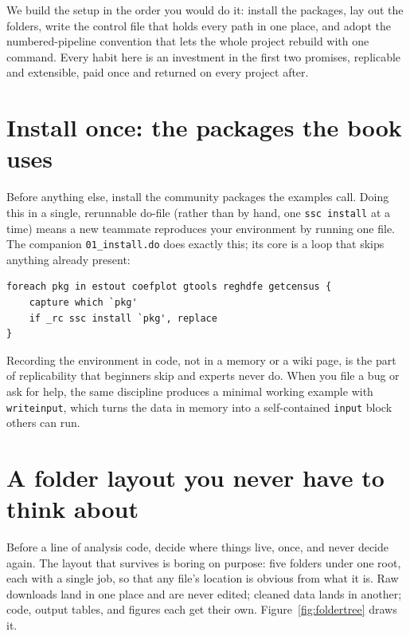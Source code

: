 \documentclass[
    a4paper,
    fontsize=10pt,
    twoside=true,
    numbers=noenddot,
]{kaobook}
\begin{document}
We build the setup in the order you would do it: install the packages, lay out the folders, write the control file that holds every path in one place, and adopt the numbered-pipeline convention that lets the whole project rebuild with one command. Every habit here is an investment in the first two promises, replicable and extensible, paid once and returned on every project after.

\section{Install once: the packages the book uses}
Before anything else, install the community packages the examples call. Doing this in a single, rerunnable do-file (rather than by hand, one \texttt{ssc install} at a time) means a new teammate reproduces your environment by running one file. The companion \texttt{01\_install.do} does exactly this; its core is a loop that skips anything already present:
{\footnotesize
\begin{verbatim}
foreach pkg in estout coefplot gtools reghdfe getcensus {
    capture which `pkg'
    if _rc ssc install `pkg', replace
}
\end{verbatim}
}
Recording the environment in code, not in a memory or a wiki page, is the part of replicability that beginners skip and experts never do. When you file a bug or ask for help, the same discipline produces a minimal working example with \texttt{writeinput}, which turns the data in memory into a self-contained \texttt{input} block others can run.

\section{A folder layout you never have to think about}\label{sec:folders}
Before a line of analysis code, decide where things live, once, and never decide again. The layout that survives is boring on purpose: five folders under one root, each with a single job, so that any file's location is obvious from what it is. Raw downloads land in one place and are never edited; cleaned data lands in another; code, output tables, and figures each get their own. Figure~\ref{fig:foldertree} draws it.
\end{document}

